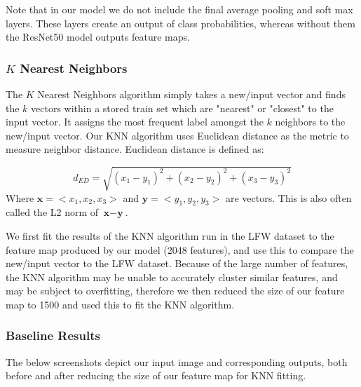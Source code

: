 \documentclass[conference]{IEEEtran}
\begin{document}
Note that in our model we do not include the final average pooling and soft max layers. These layers create an output of class probabilities, whereas without them the ResNet50 model outputs feature maps.

\subsubsection{$K$ Nearest Neighbors}
The $K$ Nearest Neighbors algorithm simply takes a new/input vector and finds the $k$ vectors within a stored train set which are "nearest" or "closest" to the input vector. It assigns the most frequent label amongst the $k$ neighbors to the new/input vector. Our KNN algorithm uses Euclidean distance as the metric to measure neighbor distance. Euclidean distance is defined as:

\begin{equation}
d_{ED}= \sqrt{ (x_1-y_1)^2 + (x_2-y_2)^2 + (x_3-y_3)^2 } \label{eq:1}
\end{equation}
Where $\textbf{x}=<x_1,x_2,x_3>$ and $\textbf{y}=<y_1,y_2,y_3>$ are vectors. This is also often called the L2 norm of $\textbf{x}-\textbf{y}$.

We first fit the results of the KNN algorithm run in the LFW dataset to the feature map produced by our model (2048 features), and use this to compare the new/input vector to the LFW dataset. Because of the large number of features, the KNN algorithm may be unable to accurately cluster similar features, and may be subject to overfitting, therefore we then reduced the size of our feature map to 1500 and used this to fit the KNN algorithm. 

\subsubsection{Baseline Results}
The below screenshots depict our input image and corresponding outputs, both before and after reducing the size of our feature map for KNN fitting. 
\end{document}
